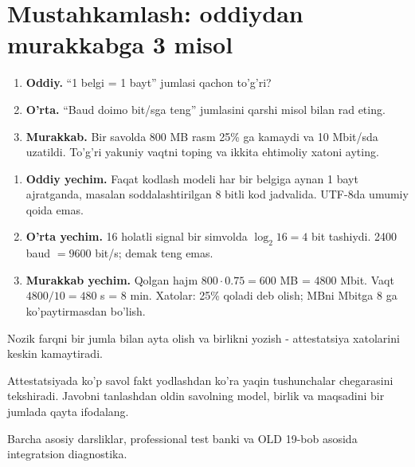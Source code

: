 \documentclass[11pt,a4paper,oneside]{book}
\begin{document}
\section{Mustahkamlash: oddiydan murakkabga 3 misol}
\begin{taskbox}
\begin{enumerate}[leftmargin=7mm]
\item \textbf{Oddiy.} ``1 belgi = 1 bayt'' jumlasi qachon to'g'ri?
\item \textbf{O'rta.} ``Baud doimo bit/sga teng'' jumlasini qarshi misol bilan rad eting.
\item \textbf{Murakkab.} Bir savolda 800 MB rasm 25\% ga kamaydi va 10 Mbit/sda uzatildi. To'g'ri yakuniy vaqtni toping va ikkita ehtimoliy xatoni ayting.
\end{enumerate}
\end{taskbox}

\begin{solutionbox}
\begin{enumerate}[leftmargin=7mm]
\item \textbf{Oddiy yechim.} Faqat kodlash modeli har bir belgiga aynan 1 bayt ajratganda, masalan soddalashtirilgan 8 bitli kod jadvalida. UTF-8da umumiy qoida emas.
\item \textbf{O'rta yechim.} 16 holatli signal bir simvolda $\log_2 16=4$ bit tashiydi. 2400 baud $=9600$ bit/s; demak teng emas.
\item \textbf{Murakkab yechim.} Qolgan hajm $800\cdot0.75=600$ MB = 4800 Mbit. Vaqt $4800/10=480$ s = 8 min. Xatolar: 25\% qoladi deb olish; MBni Mbitga 8 ga ko'paytirmasdan bo'lish.
\end{enumerate}
\end{solutionbox}
\begin{attest}Nozik farqni bir jumla bilan ayta olish va birlikni yozish - attestatsiya xatolarini keskin kamaytiradi.\end{attest}

\begin{summarybox}
Attestatsiyada ko'p savol fakt yodlashdan ko'ra yaqin tushunchalar chegarasini tekshiradi. Javobni tanlashdan oldin savolning model, birlik va maqsadini bir jumlada qayta ifodalang.
\end{summarybox}
\begin{sourcebox}
Barcha asosiy darsliklar, professional test banki va OLD 19-bob asosida integratsion diagnostika.
\end{sourcebox}
\end{document}
